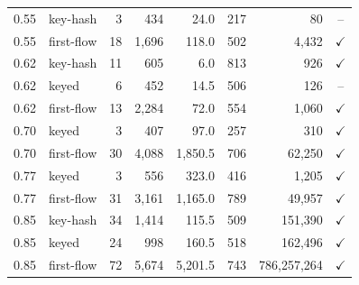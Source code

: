 \begin{table}[t]
{\begin{tabular}{rlr rr rr c}
0.55 & key-hash & 3 & 434 & 24.0 & 217 & 80 & -- \\
0.55 & first-flow & 18 & 1,696 & 118.0 & 502 & 4,432 & $\checkmark$ \\
0.62 & key-hash & 11 & 605 & 6.0 & 813 & 926 & $\checkmark$ \\
0.62 & keyed & 6 & 452 & 14.5 & 506 & 126 & -- \\
0.62 & first-flow & 13 & 2,284 & 72.0 & 554 & 1,060 & $\checkmark$ \\
0.70 & keyed & 3 & 407 & 97.0 & 257 & 310 & $\checkmark$ \\
0.70 & first-flow & 30 & 4,088 & 1,850.5 & 706 & 62,250 & $\checkmark$ \\
0.77 & keyed & 3 & 556 & 323.0 & 416 & 1,205 & $\checkmark$ \\
0.77 & first-flow & 31 & 3,161 & 1,165.0 & 789 & 49,957 & $\checkmark$ \\
0.85 & key-hash & 34 & 1,414 & 115.5 & 509 & 151,390 & $\checkmark$ \\
0.85 & keyed & 24 & 998 & 160.5 & 518 & 162,496 & $\checkmark$ \\
0.85 & first-flow & 72 & 5,674 & 5,201.5 & 743 & 786,257,264 & $\checkmark$ \\
\bottomrule
\end{tabular}}

\vspace{4pt}
\end{table}
